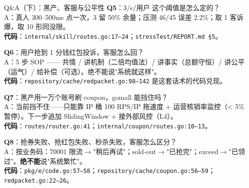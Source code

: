 \documentclass[aspectratio=169,11pt]{beamer}
\begin{document}
\begin{frame}[shrink]{Q\&A（下）：黑产、客服与公平性}
\textbf{Q5}：3/s/用户 这个阈值是怎么定的？\\
\hspace{4mm}\small A：真人 300--500ms 点一次，3 留 50\% 余量；压测 46/45 误差 2.2\%；取 1 客诉爆，取 10 形同没限。\\
\hspace{4mm}\small \textbf{代码}：\texttt{internal/skill/routes.go:17--24}；\texttt{stressTest/REPORT.md \S 5}。

\vspace{2mm}
\textbf{Q6}：用户抢到 1 分钱红包投诉，客服怎么回？\\
\hspace{4mm}\small A：5 步 SOP —— 共情 / 讲机制（二倍均值法）/ 讲事实（总额守恒）/ 讲公平（运气）/ 给补偿（可选）。绝不能说"系统就这样"。\\
\hspace{4mm}\small \textbf{代码}：\texttt{repository/cache/redpacket.go:98--142} 是这套话术的代码兑现。

\vspace{2mm}
\textbf{Q7}：黑产用一万个账号刷 coupon，gomall 能挡住吗？\\
\hspace{4mm}\small A：当前挡不住——只能靠 IP 桶 100 RPS/IP 拖速度 + 运营核销率监控（< 5\% 暂停）。下一步追加 SlidingWindow + 接外部风控（L4）。\\
\hspace{4mm}\small \textbf{代码}：\texttt{routes/router.go:41}；\texttt{internal/coupon/routes.go:10--13}。

\vspace{2mm}
\textbf{Q8}：抢券失败、抢红包失败、秒杀失败，客服怎么区分？\\
\hspace{4mm}\small A：按业务码：70001 限流$\to$"稍后再试"；sold-out$\to$"已抢完"；exceed$\to$"已领过"。\textbf{绝不能}说"系统繁忙"。\\
\hspace{4mm}\small \textbf{代码}：\texttt{pkg/e/code.go:57--58}；\texttt{repository/cache/coupon.go:56--59}；\texttt{redpacket.go:22--26}。
\end{frame}
\end{document}
